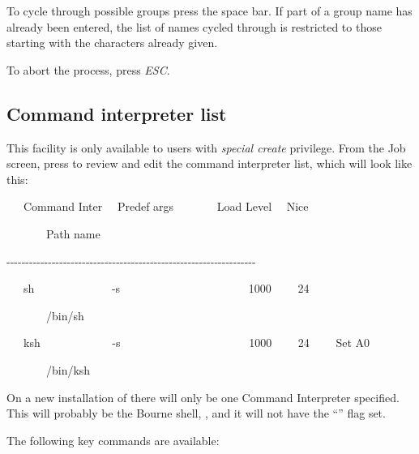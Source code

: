 To cycle through possible groups press the space bar. If part of a group
name has already been entered, the list of names cycled through is
restricted to those starting with the characters already given.

To abort the process, press \textit{ESC}.

\subsection{Command interpreter list}
This facility is only available to users with \textit{special create}
privilege. From the Job screen, press  to
review and edit the command interpreter list, which will look like
this:

\begin{exparasmall}

\ \ \ Command Inter \ \ Predef args \ \ \ \ \ \ \ Load Level \ \ Nice

\ \ \ \ \ \ \ Path name

{}-{}-{}-{}-{}-{}-{}-{}-{}-{}-{}-{}-{}-{}-{}-{}-{}-{}-{}-{}-{}-{}-{}-{}-{}-{}-{}-{}-{}-{}-{}-{}-{}-{}-{}-{}-{}-{}-{}-{}-{}-{}-{}-{}-{}-{}-{}-{}-{}-{}-{}-{}-{}-{}-{}-{}-{}-{}-{}-{}-{}-{}-{}-{}-{}-{}-

\bigskip


\ \ \ sh \ \ \ \ \ \ \ \ \ \ \ \ \ {}-s
\ \ \ \ \ \ \ \ \ \ \ \ \ \ \ \ \ \ \ \ \ \ 1000 \ \ \ \ 24

\ \ \ \ \ \ \ /bin/sh

\bigskip


\ \ \ ksh \ \ \ \ \ \ \ \ \ \ \ \ {}-s
\ \ \ \ \ \ \ \ \ \ \ \ \ \ \ \ \ \ \ \ \ \ 1000 \ \ \ \ 24 \ \ \ \ Set
A0

\ \ \ \ \ \ \ /bin/ksh

\end{exparasmall}

On a new installation of \ProductName{} there will only be one Command
Interpreter specified. This will probably be the Bourne shell,
, and it will not have the
``'' flag set.

The following key commands are available:


